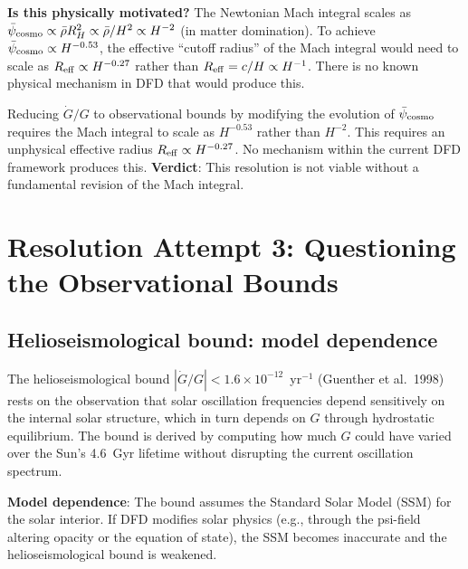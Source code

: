 \documentclass[11pt]{article}
\newcommand{\ee}[1]{\times 10^{#1}}
\newcommand{\psicosmo}{\bar{\psi}_{\rm cosmo}}
\begin{document}
\textbf{Is this physically motivated?} The Newtonian Mach integral scales as
$\psicosmo \propto \bar{\rho}R_H^2 \propto \bar{\rho}/H^2 \propto H^{-2}$
(in matter domination). To achieve $\psicosmo \propto H^{-0.53}$, the effective
``cutoff radius'' of the Mach integral would need to scale as
$R_{\rm eff} \propto H^{-0.27}$ rather than $R_{\rm eff} = c/H \propto H^{-1}$.
There is no known physical mechanism in DFD that would produce this.

\begin{tcolorbox}[colback=orange!5!white, colframe=orange!60!black,
  title=\textbf{Resolution 2 Assessment: Modified Evolution Is Highly Fine-Tuned}]
Reducing $\dot{G}/G$ to observational bounds by modifying the evolution of
$\psicosmo$ requires the Mach integral to scale as $H^{-0.53}$ rather
than $H^{-2}$. This requires an unphysical effective radius
$R_{\rm eff} \propto H^{-0.27}$. No mechanism within the current DFD
framework produces this. \textbf{Verdict}: This resolution is not viable
without a fundamental revision of the Mach integral.
\end{tcolorbox}

\section{Resolution Attempt 3: Questioning the Observational Bounds}
\label{sec:observational}

\subsection{Helioseismological bound: model dependence}

The helioseismological bound $|\dot{G}/G| < 1.6\ee{-12}$~yr$^{-1}$ (Guenther
et al.\ 1998) rests on the observation that solar oscillation frequencies
depend sensitively on the internal solar structure, which in turn depends on $G$
through hydrostatic equilibrium. The bound is derived by computing how much
$G$ could have varied over the Sun's 4.6~Gyr lifetime without disrupting the
current oscillation spectrum.

\textbf{Model dependence}: The bound assumes the Standard Solar Model (SSM)
for the solar interior. If DFD modifies solar physics (e.g., through the
psi-field altering opacity or the equation of state), the SSM becomes inaccurate
and the helioseismological bound is weakened.
\end{document}
